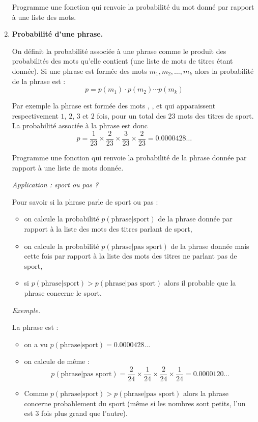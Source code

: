 \documentclass[11pt,class=report,crop=false]{standalone}
\begin{document}
\begin{activite}
\begin{enumerate}
	Programme une fonction  qui renvoie la probabilité du mot donné par rapport à une liste des mots.
	
		
 	\item \textbf{Probabilité d'une phrase.}
 	
 	On définit la probabilité associée à une phrase	comme le produit des probabilités des mots qu'elle contient (une liste de mots de titres étant donnée). 
 	Si une phrase est formée des mots $m_1, m_2,\ldots,m_k$ alors la probabilité de la phrase est :
 	$$p = p(m_1) \cdot p(m_2) \cdots p(m_k)$$
 	
 	Par exemple la phrase  est formée des mots ,
 	,  et  qui apparaissent respectivement $1$, $2$, $3$ et $2$ fois, pour un total des $23$ mots des titres de sport. La probabilité associée à la phrase est donc
 	$$p = \frac{1}{23} \times \frac{2}{23} \times \frac{3}{23} \times \frac{2}{23} = 0.0000428\ldots$$

 	Programme une fonction  qui renvoie la probabilité de la phrase donnée par rapport à une liste de mots donnée.
 	
 	\medskip
 	
 	\emph{Application : sport ou pas ?}
 	
 	Pour savoir si la phrase  parle de sport ou pas :
 	\begin{itemize}
 		\item on calcule la probabilité $p(\text{phrase}|\text{sport})$ de la phrase donnée par rapport à la liste des mots des titres parlant de sport,
 		\item  on calcule la probabilité $p(\text{phrase}|\text{pas sport})$ de la phrase donnée mais cette fois par rapport à la liste des mots des titres ne parlant pas de sport,
 		\item si $p(\text{phrase}|\text{sport}) > p(\text{phrase}|\text{pas sport})$ alors il probable que la phrase concerne le sport. 
 	\end{itemize}
 	
	\medskip 
	
 	\emph{Exemple.}
 	
 	La phrase est  :
	\begin{itemize} 
		\item on a vu $p(\text{phrase}|\text{sport}) = 0.0000428\ldots$
		\item on calcule de même :
		$$p(\text{phrase}|\text{pas sport}) = \frac{2}{24} \times \frac{1}{24} \times \frac{2}{24} \times \frac{1}{24} = 0.0000120\ldots$$
        \item Comme $p(\text{phrase}|\text{sport}) > p(\text{phrase}|\text{pas sport})$ alors la phrase concerne probablement du sport (même si les nombres sont petits, l'un est $3$ fois plus grand que l'autre).
       \end{itemize}		
	

\end{enumerate}
\end{activite}
\end{document}
